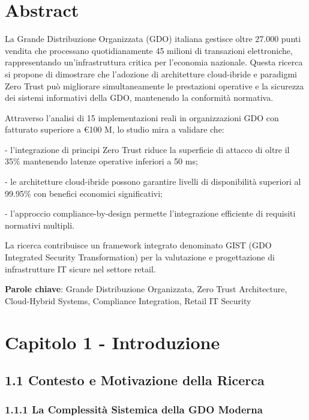 \documentclass{report}
\begin{document}
\section{\texorpdfstring{\textbf{Abstract}}{Abstract}}\label{abstract}

La Grande Distribuzione Organizzata (GDO) italiana gestisce oltre 27.000
punti vendita che processano quotidianamente 45 milioni di transazioni
elettroniche, rappresentando un'infrastruttura critica per l'economia
nazionale. Questa ricerca si propone di dimostrare che l'adozione di
architetture cloud-ibride e paradigmi Zero Trust può migliorare
simultaneamente le prestazioni operative e la sicurezza dei sistemi
informativi della GDO, mantenendo la conformità normativa.

Attraverso l'analisi di 15 implementazioni reali in organizzazioni GDO
con fatturato superiore a €100 M, lo studio mira a validare che:

- l'integrazione di principi Zero Trust riduce la superficie di attacco
di oltre il 35\% mantenendo latenze operative inferiori a 50 ms;

- le architetture cloud-ibride possono garantire livelli di
disponibilità superiori al 99.95\% con benefici economici significativi;

- l'approccio compliance-by-design permette l'integrazione efficiente di
requisiti normativi multipli.

La ricerca contribuisce un framework integrato denominato GIST (GDO
Integrated Security Transformation) per la valutazione e progettazione
di infrastrutture IT sicure nel settore retail.

\textbf{Parole chiave}: Grande Distribuzione Organizzata, Zero Trust
Architecture, Cloud-Hybrid Systems, Compliance Integration, Retail IT
Security

\section{\texorpdfstring{\textbf{Capitolo 1 -
Introduzione}}{Capitolo 1 - Introduzione}}\label{capitolo-1---introduzione}

\subsection{\texorpdfstring{\textbf{1.1 Contesto e Motivazione della
Ricerca}}{1.1 Contesto e Motivazione della Ricerca}}\label{contesto-e-motivazione-della-ricerca}

\subsubsection{\texorpdfstring{\textbf{1.1.1 La Complessità Sistemica
della GDO
Moderna}}{1.1.1 La Complessità Sistemica della GDO Moderna}}\label{la-complessituxe0-sistemica-della-gdo-moderna}
\end{document}
